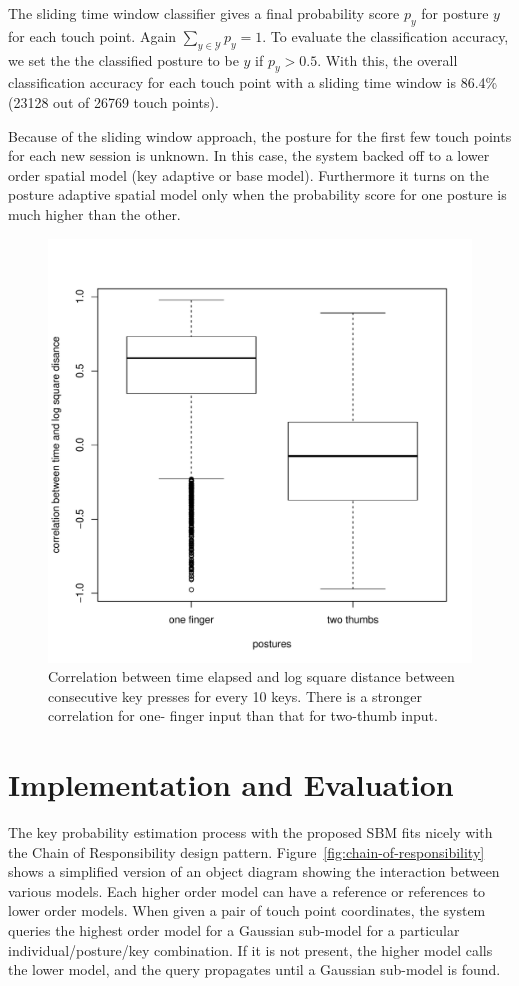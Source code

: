 \documentclass{sigchi}
\begin{document}
The sliding time window classifier gives a final probability score $p_y$ for posture
$y$ for each touch point. Again $\displaystyle\sum_{y\in \mathcal{Y}}p_y = 1$. To evaluate the classification accuracy, we set the the
classified posture to be $y$ if $p_y > 0.5$. With this, the overall classification 
accuracy for each touch point with a sliding time window
is 86.4\% (23128 out of 26769 touch points).

Because of the sliding window approach, the posture for the first few touch points  
for each new session is unknown. In this case, the system backed off to a lower order spatial 
model (key adaptive or base model). Furthermore  it turns on the posture 
adaptive spatial model only when the probability score for one posture is much 
higher than the other.

\begin{figure}[tb]
  \centering
  \includegraphics[width=0.8\columnwidth]{figures/boxplot.pdf}
  \caption{Correlation between time elapsed and log square distance between
  consecutive key presses for every 10 keys. There is a stronger correlation for
  one- finger input than that for two-thumb input.}
  \label{fig:boxplot}
\end{figure}

\section{Implementation and Evaluation}
The key probability estimation process with the proposed SBM fits nicely with the
Chain of Responsibility design pattern.
Figure~\ref{fig:chain-of-responsibility} shows a simplified version of an object
diagram showing the interaction between various models. Each higher order model can
have a reference or references to lower order models. When given a pair of touch
point coordinates, the system queries the highest order model for a Gaussian
sub-model for a particular individual/posture/key combination. If it is not present, 
the higher model calls the lower model, and the
query propagates until a Gaussian sub-model is found. 
\end{document}
